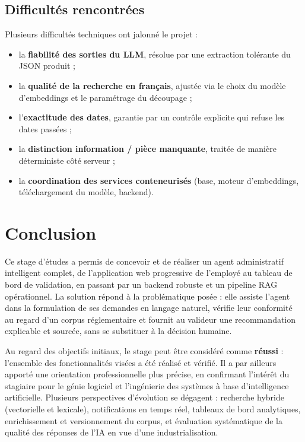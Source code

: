 \documentclass[a4paper,12pt,oneside]{report}
\begin{document}
\section{Difficultés rencontrées}
Plusieurs difficultés techniques ont jalonné le projet :

\begin{itemize}
  \item la \textbf{fiabilité des sorties du LLM}, résolue par une extraction
  tolérante du JSON produit ;
  \item la \textbf{qualité de la recherche en français}, ajustée via le choix du
  modèle d'embeddings et le paramétrage du découpage ;
  \item l'\textbf{exactitude des dates}, garantie par un contrôle explicite qui
  refuse les dates passées ;
  \item la \textbf{distinction information / pièce manquante}, traitée de manière
  déterministe côté serveur ;
  \item la \textbf{coordination des services conteneurisés} (base, moteur
  d'embeddings, téléchargement du modèle, backend).
\end{itemize}

\chapter*{Conclusion}

Ce stage d'études a permis de concevoir et de réaliser un agent administratif
intelligent complet, de l'application web progressive de l'employé au tableau de bord de
validation, en passant par un backend robuste et un pipeline RAG opérationnel. La
solution répond à la problématique posée : elle assiste l'agent dans la
formulation de ses demandes en langage naturel, vérifie leur conformité au regard
d'un corpus réglementaire et fournit au valideur une recommandation explicable et
sourcée, sans se substituer à la décision humaine.

Au regard des objectifs initiaux, le stage peut être considéré comme
\textbf{réussi} : l'ensemble des fonctionnalités visées a été réalisé et vérifié.
Il a par ailleurs apporté une orientation professionnelle plus précise, en
confirmant l'intérêt du stagiaire pour le génie logiciel et l'ingénierie des
systèmes à base d'intelligence artificielle. Plusieurs perspectives d'évolution
se dégagent : recherche hybride (vectorielle et lexicale), notifications en temps
réel, tableaux de bord analytiques, enrichissement et versionnement du corpus, et
évaluation systématique de la qualité des réponses de l'IA en vue d'une
industrialisation.
\end{document}
